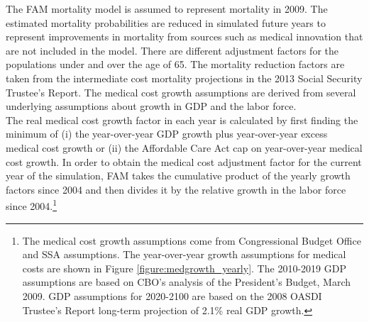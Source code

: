 
\noindent The FAM mortality model is assumed to represent mortality in 2009.
The estimated mortality probabilities are reduced in simulated future years to represent improvements in mortality from sources such as medical innovation that are not included in the model.
There are different adjustment factors for the populations under and over the age of 65.
The mortality reduction factors are taken from the intermediate cost mortality projections in the 2013 Social Security Trustee's Report.
The medical cost growth assumptions are derived from several underlying assumptions about growth in GDP and the labor force. \\


\noindent The real medical cost growth factor in each year is calculated by first finding the minimum of (i) the year-over-year GDP growth plus year-over-year excess medical cost growth or (ii) the Affordable Care Act cap on year-over-year medical cost growth. In order to obtain the medical cost adjustment factor for the current year of the simulation, FAM takes the cumulative product of the yearly growth factors since 2004 and then divides it by the relative growth in the labor force since 2004.\footnote{The medical cost growth assumptions come from Congressional Budget Office and SSA assumptions.
The year-over-year growth assumptions for medical costs are shown in Figure \ref{figure:medgrowth_yearly}.
The 2010-2019 GDP assumptions are based on CBO's analysis of the President's Budget, March 2009.
GDP assumptions for 2020-2100 are based on the 2008 OASDI Trustee's Report long-term projection of 2.1\% real GDP growth.} \\


